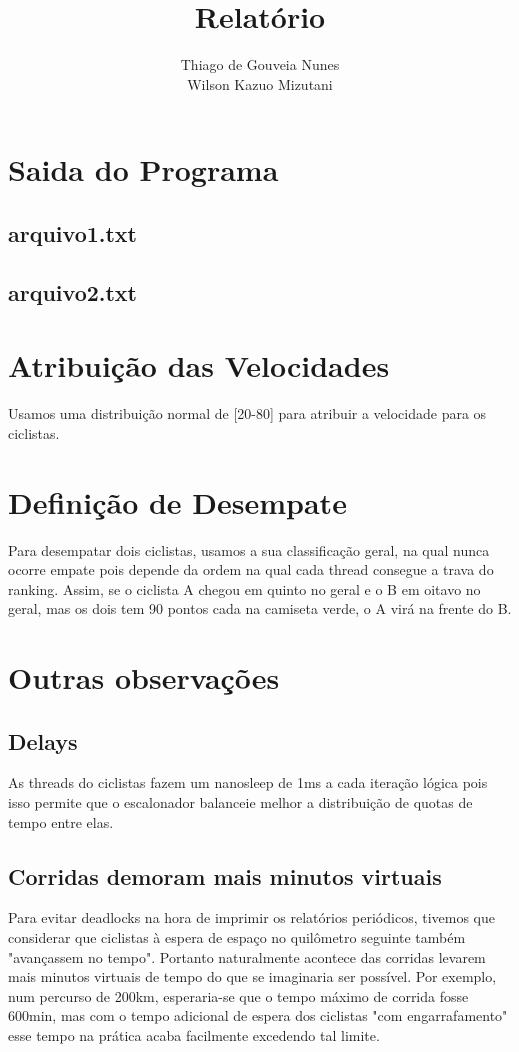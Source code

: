 \documentclass[a4paper,11pt]{article}
\title{Relatório}
\author{Thiago de Gouveia Nunes \\ Wilson Kazuo Mizutani}
\begin{document}
\maketitle
\tableofcontents

\section{Saida do Programa}
\subsection{arquivo1.txt}
\subsection{arquivo2.txt}
\section{Atribuição das Velocidades}
  Usamos uma distribuição normal de [20-80] para atribuir a velocidade para os ciclistas.
\section{Definição de Desempate}
  Para desempatar dois ciclistas, usamos a sua classificação geral, na qual nunca ocorre empate pois depende da ordem na qual cada thread
consegue a trava do ranking. Assim, se o ciclista A chegou em quinto no geral e o B em oitavo no geral, mas os dois tem 90 pontos
cada na camiseta verde, o A virá na frente do B.
\section{Outras observações}
\subsection{Delays}
  As threads do ciclistas fazem um nanosleep de 1ms a cada iteração lógica pois isso permite que o escalonador balanceie melhor a
distribuição de quotas de tempo entre elas.
\subsection{Corridas demoram mais minutos virtuais}
  Para evitar deadlocks na hora de imprimir os relatórios periódicos, tivemos que considerar que ciclistas à espera de espaço no
quilômetro seguinte também "avançassem no tempo". Portanto naturalmente acontece das corridas levarem mais minutos virtuais de tempo do
que se imaginaria ser possível. Por exemplo, num percurso de 200km, esperaria-se que o tempo máximo de corrida fosse 600min, mas com o
tempo adicional de espera dos ciclistas "com engarrafamento" esse tempo na prática acaba facilmente excedendo tal limite.
\end{document}

